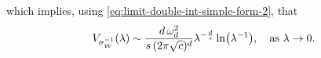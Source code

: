 \documentclass[a4paper,12pt]{article}
\let\originalleft\left
\let\originalright\right
\renewcommand{\left}{\mathopen{}\mathclose\bgroup\originalleft}
\renewcommand{\right}{\aftergroup\egroup\originalright}
\newcommand{\symbolnotsobw}{\symbolnot_{\mathcal{W}}}
\newcommand{\symbolnot}{\sigma}
\begin{document}
which implies, using \eqref{eq:limit-double-int-simple-form-2}, that 
\begin{equation}\label{eq:asymp-vol-case-r-equals-s}
    V_{\symbolnotsobw^{-1}}(\lambda)
    \sim \frac{d\,\omega_d^2}{s\,(2\pi\sqrt{c})^{d}}
    \lambda^{-\frac{d}{s}}\ln\left(\lambda^{-1}\right),
    \quad \text{as } \lambda\to0.
\end{equation}
\fi 
\end{document}
